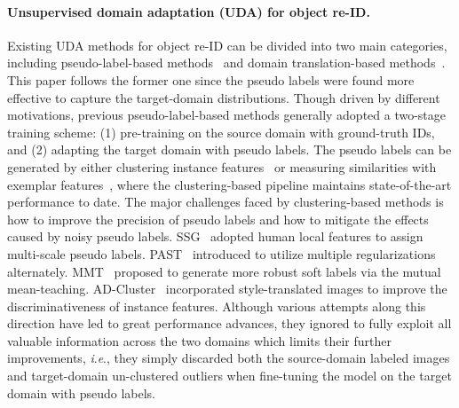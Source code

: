 \documentclass{article}
\newcommand{\ie}{\textit{i}.\textit{e}., }
\begin{document}
\paragraph{Unsupervised domain adaptation (UDA) for object re-ID.}
Existing UDA methods for object re-ID can be divided into two main categories, including pseudo-label-based methods~\cite{song2018unsupervised,yang2019selfsimilarity,zhang2019self,ge2020mutual,zhai2020ad,zhong2019invariance,yu2019unsupervised,wang2020unsupervised} and domain translation-based methods~\cite{deng2018image,wei2018person,chen2019instance,ge2020structured}.
This paper follows the former one since the pseudo labels were found more effective to capture the target-domain distributions.
Though driven by different motivations,
previous pseudo-label-based methods generally adopted a two-stage training scheme: 
(1) pre-training on the source domain with ground-truth IDs, and
(2) adapting the target domain with pseudo labels.
The pseudo labels can be generated by either clustering instance features~\cite{song2018unsupervised,yang2019selfsimilarity,zhang2019self,ge2020mutual,zhai2020ad} or measuring similarities with exemplar features~\cite{zhong2019invariance,yu2019unsupervised,wang2020unsupervised},
where the clustering-based pipeline maintains state-of-the-art performance to date.
The major challenges faced by clustering-based methods is how to improve the precision of pseudo labels and how to mitigate the effects caused by noisy pseudo labels.
SSG~\cite{yang2019selfsimilarity} adopted human local features to assign multi-scale pseudo labels. 
PAST~\cite{zhang2019self} introduced to utilize multiple regularizations alternately.
MMT~\cite{ge2020mutual} proposed to generate more robust soft labels via the mutual mean-teaching.
AD-Cluster~\cite{zhai2020ad} incorporated style-translated images to improve the discriminativeness of instance features.
Although various attempts along this direction have led to great performance advances,
they ignored to fully exploit all valuable information across the two domains which limits their further improvements,
\ie they simply discarded both the source-domain labeled images and target-domain un-clustered outliers when fine-tuning the model on the target domain with pseudo labels.




\vspace{-5pt}
\end{document}
